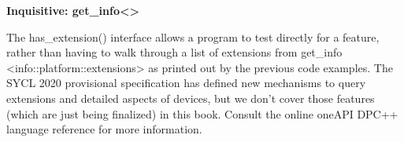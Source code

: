 \hspace*{\fill} \par %
\textbf{Inquisitive: get\_info<>}

The has\_extension() interface allows a program to test directly for a feature, rather than having to walk through a list of extensions from get\_info <info::platform::extensions> as printed out by the previous code examples. The SYCL 2020 provisional specification has defined new mechanisms to query extensions and detailed aspects of devices, but we don't cover those features (which are just being finalized) in this book. Consult the online oneAPI DPC++ language reference for more information.
















